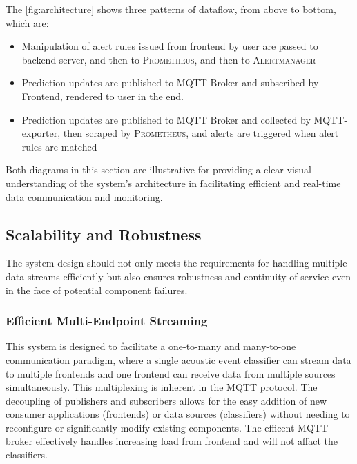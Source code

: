 The \ref{fig:architecture} shows three patterns of dataflow, from above to bottom, which are:
\begin{itemize}
  \item Manipulation of alert rules issued from frontend by user are passed to backend server, and then to \textsc{Prometheus}, and then to \textsc{Alertmanager}
  \item Prediction updates are published to MQTT Broker and subscribed by Frontend, rendered to user in the end.
  \item Prediction updates are published to MQTT Broker and collected by MQTT-exporter, then scraped by \textsc{Prometheus}, and alerts are triggered when alert rules are matched
\end{itemize}

Both diagrams in this section are illustrative for providing a clear visual understanding of the system's architecture in facilitating efficient and real-time data communication and monitoring.

\subsection{Scalability and Robustness}
The system design should not only meets the requirements for handling multiple data streams efficiently but also ensures robustness and continuity of service even in the face of potential component failures.

\subsubsection{Efficient Multi-Endpoint Streaming}
This system is designed to facilitate a one-to-many and many-to-one communication paradigm, where a single acoustic event classifier can stream data to multiple frontends and one frontend can receive data from multiple sources simultaneously. This multiplexing is inherent in the MQTT protocol. The decoupling of publishers and subscribers allows for the easy addition of new consumer applications (frontends) or data sources (classifiers) without needing to reconfigure or significantly modify existing components. The efficent MQTT broker effectively handles increasing load from frontend and will not affact the classifiers.

